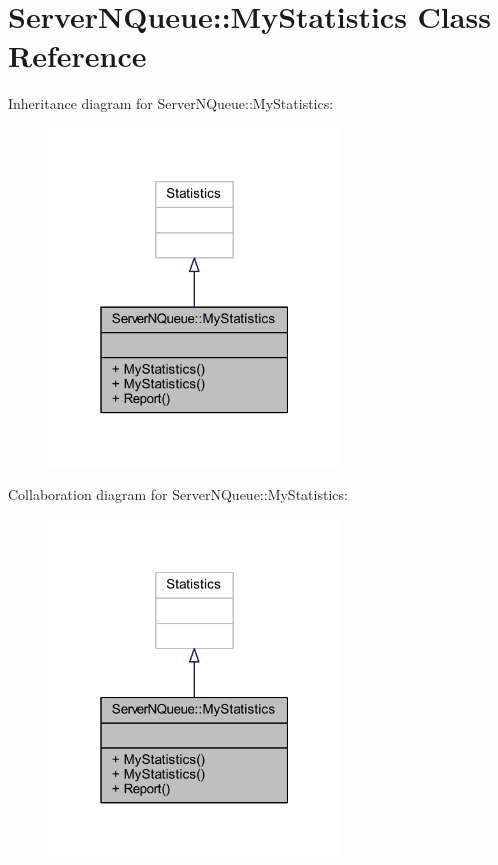 \hypertarget{class_server_n_queue_1_1_my_statistics}{}\section{Server\+N\+Queue\+:\+:My\+Statistics Class Reference}
\label{class_server_n_queue_1_1_my_statistics}


Inheritance diagram for Server\+N\+Queue\+:\+:My\+Statistics\+:
\nopagebreak
\begin{figure}[H]
\begin{center}
\leavevmode
\includegraphics[width=220pt]{class_server_n_queue_1_1_my_statistics__inherit__graph}
\end{center}
\end{figure}


Collaboration diagram for Server\+N\+Queue\+:\+:My\+Statistics\+:
\nopagebreak
\begin{figure}[H]
\begin{center}
\leavevmode
\includegraphics[width=220pt]{class_server_n_queue_1_1_my_statistics__coll__graph}
\end{center}
\end{figure}
